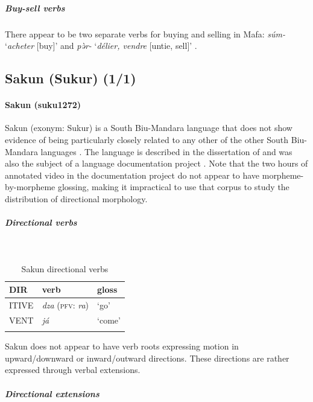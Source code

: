 \subparagraph{Buy-sell verbs}

There appear to be two separate verbs for buying and selling in Mafa: \textit{súm-} `\textit{acheter} [buy]' and \textit{pə̀r-} `\textit{délier, vendre} [untie, sell]' \citep[308, 323]{barreteauLexiqueMafaLangue1990}.

\subsection{Sakun (Sukur) (1/1)} \label{saku}

\paragraph*{Sakun (suku1272)}

Sakun (exonym: Sukur) is a South Biu-Mandara language that does not show evidence of being particularly closely related to any other of the other South Biu-Mandara languages \citep[50]{gravinaPhonologyProtoCentralChadic2014}. The language is described in the dissertation of \citet{thomasGrammarSakunSukur2014} and was also the subject of a language documentation project \citep{thomasSakunSukurLanguage2014}. Note that the two hours of annotated video in the documentation project do not appear to have morpheme-by-morpheme glossing, making it impractical to use that corpus to study the distribution of directional morphology. 

\subparagraph{Directional verbs}~

\begin{table}[H]
\caption{Sakun directional verbs} 
\label{tab:sakuV}
\begin{tabular}{lll} %
	\lsptoprule
	DIR & verb & gloss   \\ %
	\midrule
	ITIVE & \textit{dza} (\textsc{pfv}: \textit{ra}) & `go' \\
	VENT & \textit{já} & `come' \\
	\lspbottomrule
\end{tabular}
\end{table}

Sakun does not appear to have verb roots expressing motion in upward{\slash}downward or inward/outward directions. These directions are rather expressed through verbal extensions.

\newpage
\subparagraph{Directional extensions}~

